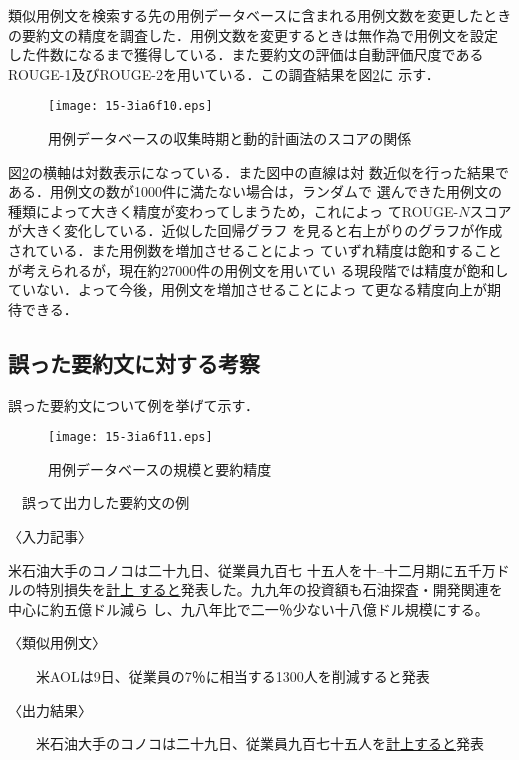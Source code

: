 \documentclass[japanese]{jnlp_1.4}
\newcounter{exp}
\def\exp#1{}
\begin{document}
類似用例文を検索する先の用例データベースに含まれる用例文数を変更したとき
の要約文の精度を調査した．用例文数を変更するときは無作為で用例文を設定
した件数になるまで獲得している．また要約文の評価は自動評価尺度である
ROUGE-1及びROUGE-2を用いている．この調査結果を図\ref{図:DB大きさと精度}に
示す．

\begin{figure}[t]
\begin{center}
\texttt{[image: 15-3ia6f10.eps]}
\caption{用例データベースの収集時期と動的計画法のスコアの関係}
 \label{図:用例データベースと動的計画法のスコアの関係}
 \end{center}
\end{figure}

図\ref{図:DB大きさと精度}の横軸は対数表示になっている．また図中の直線は対
数近似を行った結果である．用例文の数が1000件に満たない場合は，ランダムで
選んできた用例文の種類によって大きく精度が変わってしまうため，これによっ
てROUGE-$N$スコアが大きく変化している．近似した回帰グラフ
を見ると右上がりのグラフが作成されている．また用例数を増加させることによっ
ていずれ精度は飽和することが考えられるが，現在約27000件の用例文を用いてい
る現段階では精度が飽和していない．よって今後，用例文を増加させることによっ
て更なる精度向上が期待できる．



\subsection{誤った要約文に対する考察}\label{節:誤った文に対する考察}

誤った要約文について例を挙げて示す．

\begin{figure}[t]
\begin{center}
\texttt{[image: 15-3ia6f11.eps]}
\caption{用例データベースの規模と要約精度}
\label{図:DB大きさと精度}
\end{center}
\end{figure}

\begin{screen}
\exp{例:例1}　誤って出力した要約文の例
 
〈入力記事〉

{\setlength{\leftskip}{2zw}
米石油大手のコノコは二十九日、従業員九百七
十五人を\setnami{}十--十二月期に五千万ドルの特別損失を\ul{計上
すると}発表した。九九年の投資額も石油探査・開発関連を中心に約五億ドル減ら
し、九八年比で二一％少ない十八億ドル規模にする。
\par}

〈類似用例文〉

　　米AOLは9日、従業員の7％に相当する1300人を削減すると発表

〈出力結果〉

　　米石油大手のコノコは二十九日、従業員九百七十五人を\ul{計上すると}発表
\end{screen}
\end{document}
